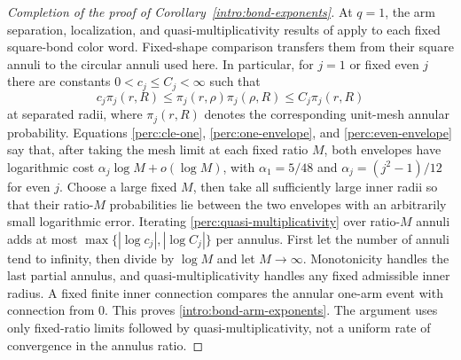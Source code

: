 \begin{proof}[Completion of the proof of Corollary~\ref{intro:bond-exponents}]
At $q=1$, the arm separation, localization, and
quasi-multiplicativity results of
\citet[Propositions~6.2, 6.3, and 6.5]{DMT2021Fractal} apply to each
fixed square-bond color word.  Fixed-shape comparison transfers them
from their square annuli to the circular annuli used here.  In
particular, for $j=1$ or fixed even $j$ there are constants
$0<c_j\le C_j<\infty$ such that
\begin{equation}\label{perc:quasi-multiplicativity}
 c_j\pi_j(r,R)
 \le \pi_j(r,\rho)\pi_j(\rho,R)
 \le C_j\pi_j(r,R)
\end{equation}
at separated radii, where $\pi_j(r,R)$ denotes the corresponding
unit-mesh annular probability.  Equations
\eqref{perc:cle-one}, \eqref{perc:one-envelope}, and
\eqref{perc:even-envelope} say that, after taking the mesh limit
at each fixed ratio $M$, both envelopes have logarithmic cost
$\alpha_j\log M+o(\log M)$, with
$\alpha_1=5/48$ and $\alpha_j=(j^2-1)/12$ for even $j$.
Choose a large fixed $M$, then take all sufficiently large inner
radii so that their ratio-$M$ probabilities lie between the two
envelopes with an arbitrarily small logarithmic error.  Iterating
\eqref{perc:quasi-multiplicativity} over ratio-$M$ annuli adds at most
$\max\{|\log c_j|,|\log C_j|\}$ per annulus.  First let the number of
annuli tend to infinity, then divide by $\log M$ and let $M\to\infty$.
Monotonicity handles the last partial annulus,
and quasi-multiplicativity handles any fixed admissible inner radius.
A fixed finite inner connection compares the annular one-arm event
with connection from $0$.  This proves
\eqref{intro:bond-arm-exponents}.  The argument uses only fixed-ratio
limits followed by quasi-multiplicativity, not a uniform rate of
convergence in the annulus ratio.


\end{proof}
